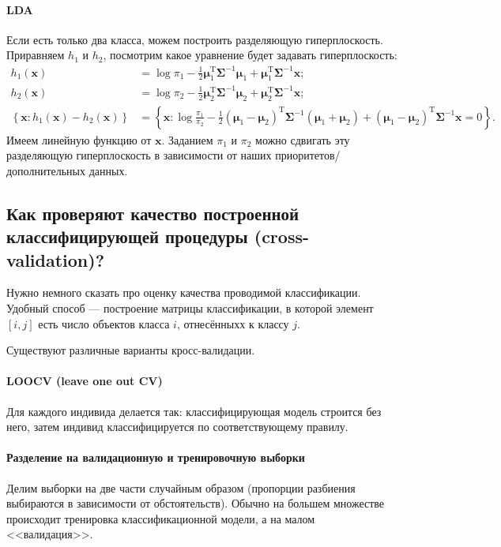 \documentclass[12pt,a4paper,final]{article}
\newcommand{\1}{\mathds{1}}
\begin{document}
\paragraph{LDA}
Если есть только два класса, можем построить разделяющую гиперплоскость.
Приравняем $h_1$ и $h_2$, посмотрим какое уравнение будет задавать гиперплоскость:
\begin{align*}
h_1(\bm x) &= \log \pi_1 - \frac{1}{2} \bm \mu_1^\mathrm{T} \bm \Sigma^{-1} \bm \mu_1 +  \bm \mu_1^\mathrm{T} \bm \Sigma^{-1} \bm x; \\
h_2(\bm x) &= \log \pi_2 - \frac{1}{2} \bm \mu_2^\mathrm{T} \bm \Sigma^{-1} \bm \mu_2 +  \bm \mu_2^\mathrm{T} \bm \Sigma^{-1} \bm x; \\
\left\{\bm x : h_1(\bm x) - h_2(\bm x) \right\} &= \left\{ \bm x : \log \frac{\pi_1}{\pi_2}  - \frac{1}{2} (\bm\mu_1-\bm\mu_2)^\mathrm{T} \bm \Sigma^{-1}  (\bm\mu_1 + \bm\mu_2) + (\bm \mu_1 - \bm \mu_2)^\mathrm{T} \bm \Sigma^{-1} \bm x = 0 \right\}.
\end{align*}
Имеем линейную функцию от $\bm x$. Заданием $\pi_1$ и $\pi_2$ можно сдвигать эту разделяющую гиперплоскость в зависимости от наших приоритетов/дополнительных данных.

\subsection{Как проверяют качество построенной классифицирующей процедуры (cross-validation)?}

Нужно немного сказать про оценку качества проводимой классификации. Удобный способ --- построение матрицы классификации, в которой элемент $[i,j]$ есть число объектов класса $i$, отнесённыхх к классу $j$.

Существуют различные варианты кросс-валидации.
\paragraph{LOOCV (leave one out CV)} Для каждого индивида делается так: классифицирующая модель строится без него, затем индивид классифицируется по соответствующему правилу. 

\paragraph{Разделение на валидационную и тренировочную выборки} Делим выборки на две части случайным образом (пропорции разбиения выбираются в зависимости от обстоятельств). Обычно на большем множестве происходит тренировка классификационной модели, а на малом <<валидация>>.
\end{document}
